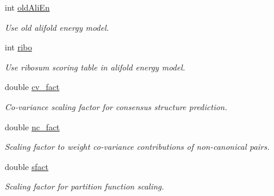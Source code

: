 \begin{DoxyCompactItemize}
\mbox{\label{structvrna__md__s_ab53aec4503130877973c6111ae6f0f76}} 
int \mbox{\hyperlink{structvrna__md__s_ab53aec4503130877973c6111ae6f0f76}{old\+Ali\+En}}
\begin{DoxyCompactList}\small\item\em Use old alifold energy model. \end{DoxyCompactList}\item 
\mbox{\label{structvrna__md__s_a3df2ae4bd9c133ef8ab92a53b1d035ec}} 
int \mbox{\hyperlink{structvrna__md__s_a3df2ae4bd9c133ef8ab92a53b1d035ec}{ribo}}
\begin{DoxyCompactList}\small\item\em Use ribosum scoring table in alifold energy model. \end{DoxyCompactList}\item 
\mbox{\label{structvrna__md__s_a62ebefb9d0643e5c4c8a2ec84a105ce6}} 
double \mbox{\hyperlink{structvrna__md__s_a62ebefb9d0643e5c4c8a2ec84a105ce6}{cv\+\_\+fact}}
\begin{DoxyCompactList}\small\item\em Co-\/variance scaling factor for consensus structure prediction. \end{DoxyCompactList}\item 
\mbox{\label{structvrna__md__s_abcf568e6124bfcb2f847ff4eb0dfded6}} 
double \mbox{\hyperlink{structvrna__md__s_abcf568e6124bfcb2f847ff4eb0dfded6}{nc\+\_\+fact}}
\begin{DoxyCompactList}\small\item\em Scaling factor to weight co-\/variance contributions of non-\/canonical pairs. \end{DoxyCompactList}\item 
\mbox{\label{structvrna__md__s_ab6f4cabaa9b4726b13592486d5bc21c7}} 
double \mbox{\hyperlink{structvrna__md__s_ab6f4cabaa9b4726b13592486d5bc21c7}{sfact}}
\begin{DoxyCompactList}\small\item\em Scaling factor for partition function scaling. \end{DoxyCompactList}\item 
\mbox{\label{structvrna__md__s_ad082d0fea31e002b90cdfe5e6382f8b0}} 

\end{DoxyCompactItemize}
